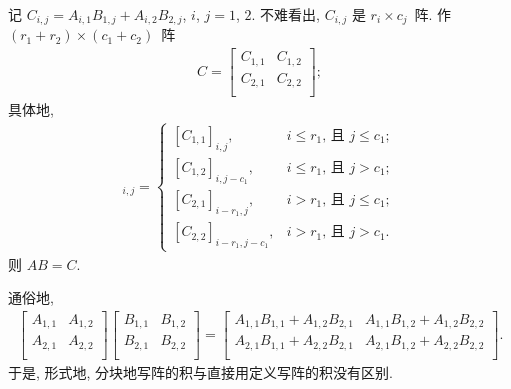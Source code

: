 \documentclass[../libro.tex]{subfiles}
\begin{document}
\begin{theorem}
    记 \(C_{i,j} = A_{i,1} B_{1,j} + A_{i,2} B_{2,j}\),
    \(i\), \(j = 1\), \(2\).
    不难看出, \(C_{i,j}\) 是 \(r_i \times c_j\)~阵.
    作 \((r_1+r_2) \times (c_1+c_2)\)~阵
    \begin{align*}
        C =
        \begin{bmatrix}
            C_{1,1} & C_{1,2} \\
            C_{2,1} & C_{2,2} \\
        \end{bmatrix};
    \end{align*}
    具体地,
    \begin{align*}
        [C]_{i,j} =
        \begin{cases}
            [C_{1,1}]_{i,j},
            & \text{\(i \leq r_1\), 且 \(j \leq c_1\)}; \\
            [C_{1,2}]_{i,j-c_1},
            & \text{\(i \leq r_1\), 且 \(j > c_1\)};    \\
            [C_{2,1}]_{i-r_1,j},
            & \text{\(i > r_1\), 且 \(j \leq c_1\)};    \\
            [C_{2,2}]_{i-r_1,j-c_1},
            & \text{\(i > r_1\), 且 \(j > c_1\)}.
        \end{cases}
    \end{align*}
    则 \(AB = C\).

    通俗地,
    \begin{align*}
        \begin{bmatrix}
            A_{1,1} & A_{1,2} \\
            A_{2,1} & A_{2,2} \\
        \end{bmatrix}
        \begin{bmatrix}
            B_{1,1} & B_{1,2} \\
            B_{2,1} & B_{2,2} \\
        \end{bmatrix}
        =
        \begin{bmatrix}
            A_{1,1} B_{1,1} + A_{1,2} B_{2,1}
            & A_{1,1} B_{1,2} + A_{1,2} B_{2,2} \\
            A_{2,1} B_{1,1} + A_{2,2} B_{2,1}
            & A_{2,1} B_{1,2} + A_{2,2} B_{2,2} \\
        \end{bmatrix}.
    \end{align*}
    于是, 形式地,
    分块地写阵的积与直接用定义写阵的积没有区别.


\end{theorem}
\end{document}
